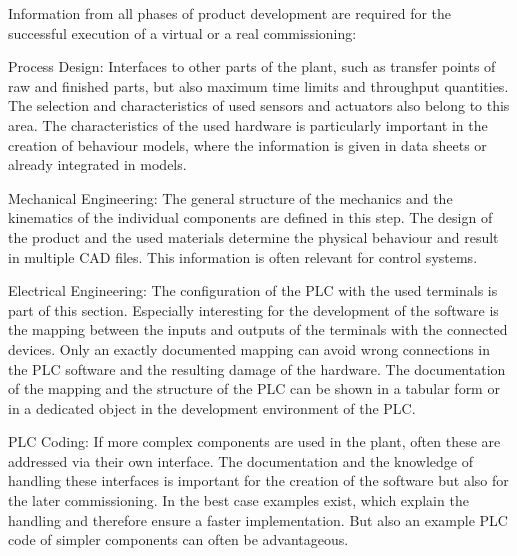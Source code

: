     Information from all phases of product development are required for the successful execution of a virtual or a real commissioning: 
    \begin{description}
        \item Process Design: Interfaces to other parts of the plant, such as transfer points of raw and finished parts, but also maximum time limits and throughput quantities. The selection and characteristics of used sensors and actuators also belong to this area. The characteristics of the used hardware is particularly important in the creation of behaviour models, where the information is given in data sheets or already integrated in models. 
        \item Mechanical Engineering: The general structure of the mechanics and the kinematics of the individual components are defined in this step. The design of the product and the used materials determine the physical behaviour and result in multiple CAD files. This information is often relevant for control systems. 
        \item Electrical Engineering: The configuration of the PLC with the used terminals is part of this section. Especially interesting for the development of the software is the mapping between the inputs and outputs of the terminals with the connected devices. Only an exactly documented mapping can avoid wrong connections in the PLC software and the resulting damage of the hardware. The documentation of the mapping and the structure of the PLC can be shown in a tabular form or in a dedicated object in the development environment of the PLC.
        \item PLC Coding: If more complex components are used in the plant, often these are addressed via their own interface. The documentation and the knowledge of handling these interfaces is important for the creation of the software but also for the later commissioning. In the best case examples exist, which explain the handling and therefore ensure a faster implementation. But also an example PLC code of simpler components can often be advantageous. 
    \end{description}



